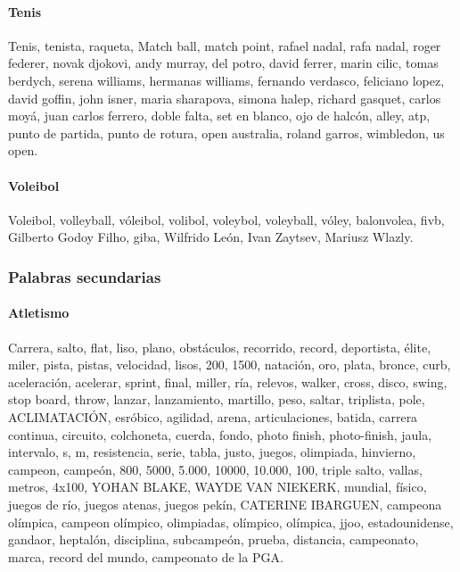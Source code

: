 \documentclass[../all.tex]{subfiles}
\begin{document}
    \paragraph{Tenis}
    Tenis, tenista, raqueta, Match ball, match point, rafael nadal, rafa nadal, roger federer, novak djokovi, andy murray, del potro, david ferrer, marin cilic, tomas berdych, serena williams, hermanas williams, fernando verdasco, feliciano lopez, david goffin, john isner, maria sharapova, simona halep, richard gasquet, carlos moyá, juan carlos ferrero, doble falta, set en blanco, ojo de halcón, alley, atp, punto de partida, punto de rotura, open australia, roland garros, wimbledon, us open.
    \paragraph{Voleibol}
    Voleibol, volleyball, vóleibol, volibol, voleybol, voleyball, vóley, balonvolea, fivb, Gilberto Godoy Filho, giba, Wilfrido León, Ivan Zaytsev, Mariusz Wlazly.
\newpage
\subsubsection{Palabras secundarias}
    \paragraph{Atletismo}
    Carrera, salto, flat, liso, plano, obstáculos, recorrido, record, deportista, élite, miler, pista, pistas, velocidad, lisos, 200, 1500, natación, oro, plata, bronce, curb, aceleración, acelerar, sprint, final, miller, ría, relevos, walker, cross, disco, swing, stop board, throw, lanzar, lanzamiento, martillo, peso, saltar, triplista, pole, ACLIMATACIÓN, esróbico, agilidad, arena, articulaciones, batida, carrera continua, circuito, colchoneta, cuerda, fondo, photo finish, photo-finish, jaula, intervalo, s, m, resistencia, serie, tabla, justo, juegos, olimpiada, hinvierno, campeon, campeón, 800, 5000, 5.000, 10000, 10.000, 100, triple salto, vallas, metros, 4x100, YOHAN BLAKE, WAYDE VAN NIEKERK, mundial, físico, juegos de río, juegos atenas, juegos pekín, CATERINE IBARGUEN, campeona olímpica, campeon olímpico, olimpiadas, olímpico, olímpica, jjoo, estadounidense, gandaor, heptalón, disciplina, subcampeón, prueba, distancia, campeonato, marca, record del mundo, campeonato de la PGA.
\end{document}
